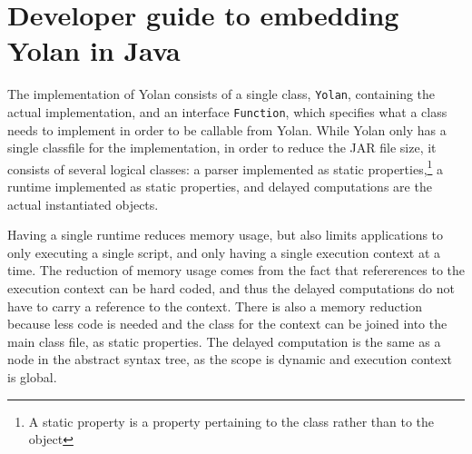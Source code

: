 \documentclass[11pt]{report}
\begin{document}
\section{Developer guide to embedding Yolan in Java}

The implementation of Yolan consists of a single class, \verb|Yolan|, containing the actual implementation, and an interface \verb|Function|, which specifies what a class needs to implement in order to be callable from Yolan.
While Yolan only has a single classfile for the implementation, in order to reduce the JAR file size, it consists of several logical classes: a parser implemented as static properties,\footnote{A static property is a property pertaining to the class rather than to the object} a runtime implemented as static properties, and delayed computations are the actual instantiated objects.

Having a single runtime reduces memory usage, but also limits applications to only executing a single script, and only having a single execution context at a time. The reduction of memory usage comes from the fact that refererences to the execution context can be hard coded, and thus the delayed computations do not have to carry a reference to the context. There is also a memory reduction because less code is needed and the class for the context can be joined into the main class file, as static properties.
The delayed computation is the same as a node in the abstract syntax tree, as the scope is dynamic and execution context is global. 
\end{document}
